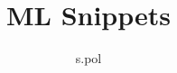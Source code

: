 \documentclass[12pt,oneside]{book}
\title{ML Snippets}
\author{s.pol}
\date{}
\begin{document}
\maketitle{}

\tableofcontents{}









%
\end{document}
